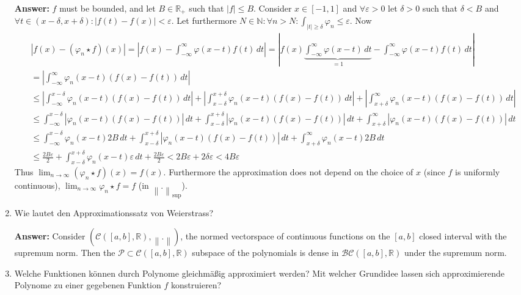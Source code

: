 \documentclass[11pt]{article}
\newcommand{\norm}[1]{\left\lVert#1\right\rVert}
\newcommand{\abs}[1]{\left|#1\right|}
\newcommand{\RR}[0]{\mathbb{R}}
\newcommand{\NN}[0]{\mathbb{N}}
\begin{document}
\begin{enumerate}
    \textbf{Answer:} $f$ must be bounded, and let $B \in \RR_+$ such that $\abs{f} \le B$. Consider $x \in [-1, 1]$ and $\forall \varepsilon > 0$ let $\delta > 0$ such that $\delta < B$ and $\forall t\in (x - \delta, x + \delta)\colon \abs{f(t) - f(x)} < \varepsilon$. Let furthermore $N \in \NN\colon \forall n > N\colon \int_{\abs{t}\ge \delta} \varphi_n \le \varepsilon$. Now
    $$\begin{aligned}
        &\abs{f(x) - (\varphi_n \star f)(x)} = \abs{f(x) - \int_{-\infty}^\infty \varphi(x-t)f(t)\,dt} = \abs{f(x) \underbrace{\int_{-\infty}^\infty \varphi(x-t)\,dt}_{=1} - \int_{-\infty}^\infty \varphi(x-t)f(t)\,dt} \\
        &= \abs{\int_{-\infty}^\infty \varphi_n(x-t)(f(x) - f(t))\,dt} \\
        &\le \abs{\int_{-\infty}^{x-\delta} \varphi_n(x-t)(f(x) - f(t))\,dt} + \abs{\int_{x-\delta}^{x+\delta} \varphi_n(x-t)(f(x) - f(t))\,dt} + \abs{\int_{x+\delta}^{\infty} \varphi_n(x-t)(f(x) - f(t))\,dt}\\
        &\le \int_{-\infty}^{x-\delta} \abs{\varphi_n(x-t)(f(x) - f(t))}\,dt + \int_{x-\delta}^{x+\delta} \abs{\varphi_n(x-t)(f(x) - f(t))}\,dt + \int_{x+\delta}^{\infty} \abs{\varphi_n(x-t)(f(x) - f(t))}\,dt\\
        &\le \int_{-\infty}^{x-\delta} \varphi_n(x-t)2B\,dt + \int_{x-\delta}^{x+\delta} \abs{\varphi_n(x-t)(f(x) - f(t))}\,dt + \int_{x+\delta}^{\infty} \varphi_n(x-t)2B\,dt\\
        &\le \frac{2B\varepsilon}{2} + \int_{x-\delta}^{x+\delta} \varphi_n(x-t) \varepsilon\,dt +  \frac{2B\varepsilon}{2} < 2B\varepsilon + 2\delta \varepsilon < 4 B \varepsilon
    \end{aligned}$$
    Thus $\lim_{n \to \infty} (\varphi_n \star f)(x) = f(x)$. Furthermore the approximation does not depend on the choice of $x$ (since $f$ is uniformly continuous), $\lim_{n\to\infty} \varphi_n \star f = f$ (in $\norm{.}_{\operatorname{sup}}$).
    \item Wie lautet den Approximationssatz von Weierstrass?

    \textbf{Answer:} Consider $(\mathcal{C}([a, b], \RR), \norm{.})$, the normed vectorspace of continuous functions on the $[a, b]$ closed interval with the supremum norm. Then the $\mathcal{P} \subset \mathcal{C}([a, b], \RR)$ subspace of the polynomials is dense in $\mathcal{BC}([a, b], \RR)$ under the supremum norm.

    \item Welche Funktionen können durch Polynome gleichmäßig approximiert werden? Mit welcher Grundidee lassen sich approximierende Polynome zu einer gegebenen Funktion $f$ konstruieren?


\end{enumerate}
\end{document}
